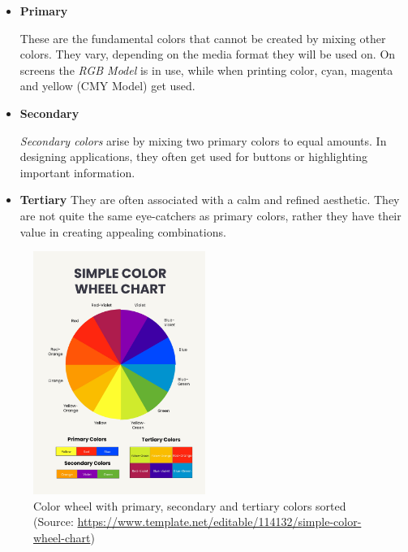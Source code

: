 \begin{itemize}
    \item \textbf{Primary}
    
    These are the fundamental colors that cannot be created by mixing other colors. They vary, depending on the media format they will be used on. On screens the \textit{RGB Model} is in use, while when printing color, cyan, magenta and yellow (CMY Model) get used.

    \item \textbf{Secondary}
    
    \textit{Secondary colors} arise by mixing two primary colors to equal amounts. In designing applications, they often get used for buttons or highlighting important information.

    \item \textbf{Tertiary}
    They are often associated with a calm and refined aesthetic. They are not quite the same eye-catchers as primary colors, rather they have their value in creating appealing combinations.
    
\end{itemize}

\begin{figure} [H]
    \center
    \includegraphics [width=0.5\textwidth] {images/paul/colorWheel.jpg}
    \caption{Color wheel with primary, secondary and tertiary colors sorted (Source: \url{https://www.template.net/editable/114132/simple-color-wheel-chart})}
\end{figure}

